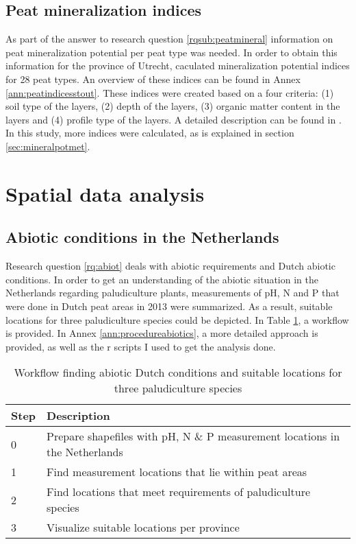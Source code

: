 \documentclass[a4paper,12pt]{scrbook}
\begin{document}
\subsection{Peat mineralization indices}
As part of the answer to research question \ref{rqsub:peatmineral} information on peat mineralization potential per peat type was needed. In order to obtain this information for the province of Utrecht, \citet{stouthamer2008toelichting} caculated mineralization potential indices for 28 peat types. An overview of these indices can be found in Annex \ref{ann:peatindicesstout}. These indices were created based on a four criteria: (1) soil type of the layers, (2) depth of the layers, (3) organic matter content in the layers and (4) profile type of the layers. A detailed description can be found in \citep{stouthamer2008toelichting}. In this study, more indices were calculated, as is explained in section \ref{sec:mineralpotmet}.

\section{Spatial data analysis}

\subsection{Abiotic conditions in the Netherlands}
Research question \ref{rq:abiot} deals with abiotic requirements and Dutch abiotic conditions. 
In order to get an understanding of the abiotic situation in the Netherlands regarding paludiculture plants, measurements of pH, \ac{N} and \ac{P} that were done in Dutch peat areas in 2013 were summarized. As a result, suitable locations for three paludiculture species could be depicted. In Table \ref{tab:workflowabiotic}, a workflow is provided. In Annex \ref{ann:procedureabiotics}, a more detailed approach is provided, as well as the r scripts I used to get the analysis done.

\begin{table}[htbp]
\caption{Workflow finding abiotic Dutch conditions and suitable locations for three paludiculture species}
\begin{center}
\begin{tabular}{|p{3cm}|p{10cm}|}
\hline
\multicolumn{1}{|l|}{\textbf{Step}} & \textbf{Description} \\ \hline
0 & Prepare shapefiles with pH, N \& P measurement locations in the Netherlands \\ \hline
1 & Find measurement locations that lie within peat areas \\ \hline
2 & Find locations that meet requirements of paludiculture species \\ \hline
3 & Visualize suitable locations per province \\ \hline
\end{tabular}
\end{center}
\label{tab:workflowabiotic}
\end{table}
\end{document}
